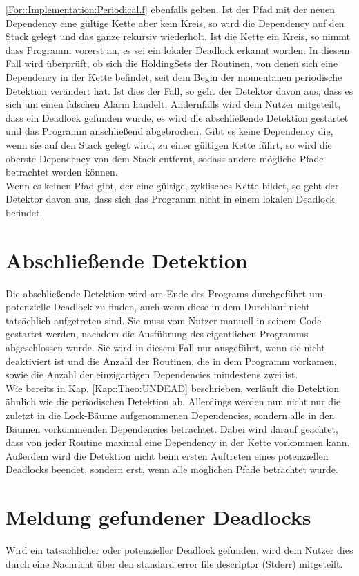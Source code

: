 \eqref{For::Implementation:Periodical.f} ebenfalls gelten. Ist der Pfad mit der 
neuen Dependency eine gültige Kette aber kein Kreis, so wird die Dependency
auf den Stack gelegt und das ganze rekursiv wiederholt. Ist die Kette ein Kreis,
so nimmt dass Programm vorerst an, es sei ein lokaler Deadlock erkannt worden.
In diesem Fall wird überprüft, ob sich die HoldingSets der Routinen, von denen
sich eine Dependency in der Kette befindet, seit dem Begin der momentanen 
periodische Detektion verändert hat. Ist dies der Fall, so geht der Detektor
 davon aus, dass es sich um einen falschen Alarm handelt. Andernfalls 
wird dem Nutzer mitgeteilt, dass ein Deadlock gefunden wurde, es wird die 
abschließende Detektion gestartet und das Programm anschließend abgebrochen.
Gibt es keine Dependency die, wenn sie auf den Stack gelegt wird, zu einer 
gültigen Kette führt, so wird die oberste Dependency von dem Stack entfernt,
sodass andere mögliche Pfade betrachtet werden können.\\
Wenn es keinen Pfad gibt, der eine gültige, zyklisches Kette bildet, so geht 
der Detektor davon aus, dass sich das Programm nicht in einem lokalen Deadlock
befindet.

\section{Abschließende Detektion}
Die abschließende Detektion wird am Ende des Programs durchgeführt um 
potenzielle Deadlock zu finden, auch wenn diese in dem Durchlauf nicht 
tatsächlich aufgetreten sind. Sie muss vom Nutzer manuell in seinem Code 
gestartet werden, nachdem die Ausführung des eigentlichen Programms abgeschlossen 
wurde. Sie wird in diesem Fall nur ausgeführt, wenn sie nicht 
deaktiviert ist und
 die Anzahl der Routinen, die in dem Programm vorkamen,
sowie die Anzahl der einzigartigen Dependencies mindestens zwei ist.\\
Wie bereits in Kap. \ref{Kap::Theo:UNDEAD} beschrieben, verläuft die Detektion 
ähnlich wie die periodischen Detektion ab.
Allerdings werden nun nicht nur die zuletzt in die Lock-Bäume aufgenommenen 
Dependencies, sondern alle in den Bäumen vorkommenden Dependencies betrachtet. 
Dabei wird darauf geachtet, dass von jeder Routine maximal eine 
Dependency in der Kette vorkommen kann. Außerdem wird die Detektion nicht beim 
ersten Auftreten eines potenziellen Deadlocks beendet, sondern erst, wenn alle 
möglichen Pfade betrachtet wurde.


\section{Meldung gefundener Deadlocks}\label{Kap::Implementation:Report}
Wird ein tatsächlicher oder potenzieller Deadlock gefunden, wird dem Nutzer 
dies durch eine Nachricht über den standard error file descriptor (Stderr)
mitgeteilt.
